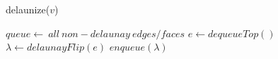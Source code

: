 \begin{algorithm}[tbh]
\caption{delaunize($v$)}
\begin{algorithmic}
\STATE $queue \gets\ all\ non-delaunay\ edges/faces$
	\STATE $e \gets dequeueTop()$
		\STATE $\lambda \gets delaunayFlip(e)$
		\STATE $enqueue(\lambda)$
	\ENDIF
\ENDWHILE
\end{algorithmic}
\end{algorithm}
